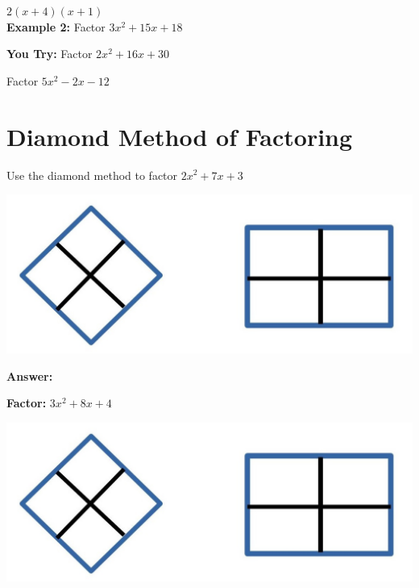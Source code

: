 \documentclass[11pt]{article}
\begin{document}
$2(x+4)(x+1)$\\


\textbf{Example 2:} Factor $3x^2+15x+18$\\

\vspace{1in}

\textbf{You Try:} Factor $2x^2+16x+30$\\

\vspace{1in}

Factor $5x^2-2x-12$\\

\pagebreak

\section*{Diamond Method of Factoring}

Use the diamond method to factor $2x^2+7x+3$\\

\begin{center}
\includegraphics[scale=.5]{diamond.jpg}
\end{center}

\vspace{1cm}

\textbf{Answer:}

\hrulefill

\textbf{Factor:} $3x^2+8x+4$\\

\begin{center}
\includegraphics[scale=.5]{diamond.jpg}
\end{center}
\end{document}
